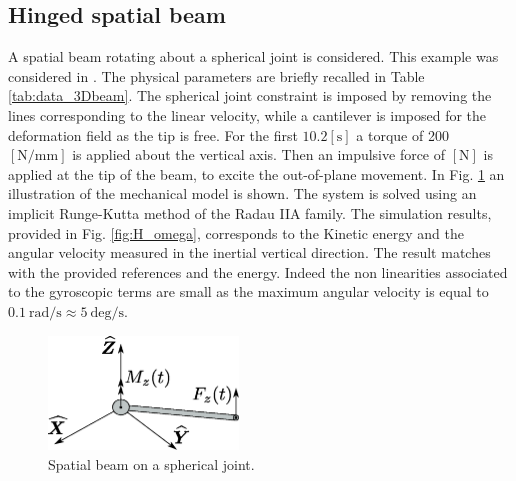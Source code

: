 \documentclass{svjour3}                     %
\begin{document}
\subsection{Hinged spatial beam}
A spatial beam rotating about a spherical joint is considered. This example was considered in \cite{Cardona2000,Ellenbroek2018}. The physical parameters are briefly recalled in Table \ref{tab:data_3Dbeam}. The spherical joint constraint is imposed by removing the lines corresponding to the linear velocity, while a cantilever is imposed for the deformation field as the tip is free. For the first $10.2 [\mathrm{s}]$ a torque of 200 $[\mathrm{N/mm}]$ is applied about the vertical axis. Then an impulsive force of $[\mathrm{N}]$ is applied at the tip of the beam, to excite the out-of-plane movement. In Fig. \ref{fig:beam_3D} an illustration of the mechanical model is shown. The system is solved using an implicit Runge-Kutta method of the Radau IIA family. The simulation results, provided in Fig. \ref{fig:H_omega}, corresponds to the Kinetic energy and the angular velocity measured in the inertial vertical direction. The result matches with the provided references and the energy. Indeed the non linearities associated to the gyroscopic terms are small as the maximum angular velocity is equal to $0.1 \ \mathrm{rad/s} \approx 5 \ \mathrm{deg/s}$. 

\begin{figure}[tb]
	\centering
	\includegraphics[width=0.45\textwidth]{rotbeam_3D.eps} 
	\caption{Spatial beam on a spherical joint.}
	\label{fig:beam_3D}
\end{figure}
\end{document}
